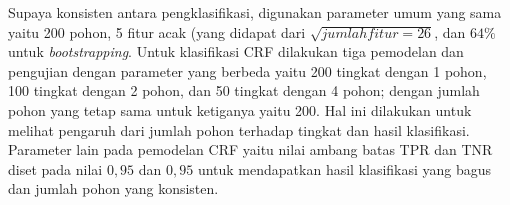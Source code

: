 Supaya konsisten antara pengklasifikasi, digunakan parameter umum yang sama
yaitu 200 pohon, 5 fitur acak (yang didapat dari $\sqrt{jumlah fitur = 26}$,
dan $ 64\% $ untuk \textit{bootstrapping}.
Untuk klasifikasi CRF dilakukan tiga pemodelan dan pengujian dengan parameter
yang berbeda yaitu 200 tingkat dengan 1 pohon, 100 tingkat dengan 2 pohon, dan
50 tingkat dengan 4 pohon; dengan jumlah pohon yang tetap sama untuk ketiganya
yaitu 200.
Hal ini dilakukan untuk melihat pengaruh dari jumlah pohon terhadap tingkat dan
hasil klasifikasi.
Parameter lain pada pemodelan CRF yaitu nilai ambang batas TPR dan TNR diset
pada nilai $0,95$ dan $0,95$ untuk mendapatkan hasil klasifikasi yang bagus dan
jumlah pohon yang konsisten.
